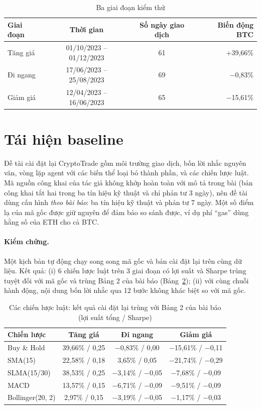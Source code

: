 \begin{table}[H]
\centering
\caption{Ba giai đoạn kiểm thử}
\label{tab:windows}
\begin{tabular}{lccr}
\toprule
Giai đoạn & Thời gian & Số ngày giao dịch & Biến động BTC \\
\midrule
Tăng giá & 01/10/2023 -- 01/12/2023 & 61 & +39,66\% \\
Đi ngang & 17/06/2023 -- 25/08/2023 & 69 & $-$0,83\% \\
Giảm giá & 12/04/2023 -- 16/06/2023 & 65 & $-$15,61\% \\
\bottomrule
\end{tabular}
\end{table}

\section{Tái hiện baseline}
\label{sec:baseline}
Đề tài cài đặt lại CryptoTrade gồm môi trường giao dịch, bốn lời nhắc nguyên văn, vòng lặp agent với các biến thể loại
bỏ thành phần, và các chiến lược luật. Mã nguồn công khai của tác giả không khớp hoàn toàn với mô tả trong bài (bản công
khai tắt hai trong ba tín hiệu kỹ thuật và chỉ phản tư 3 ngày), nên đề tài dùng cấu hình \emph{theo bài báo}: ba tín hiệu
kỹ thuật và phản tư 7 ngày. Một số điểm lạ của mã gốc được giữ nguyên để đảm bảo so sánh được, ví dụ phí ``gas'' dùng
hằng số của ETH cho cả BTC.

\paragraph{Kiểm chứng.} Một kịch bản tự động chạy song song mã gốc và bản cài đặt lại trên cùng dữ liệu. Kết quả:
(i) 6 chiến lược luật trên 3 giai đoạn có lợi suất và Sharpe trùng tuyệt đối với mã gốc và trùng Bảng 2 của bài báo
(Bảng~\ref{tab:rules}); (ii) với cùng chuỗi hành động, nội dung bốn lời nhắc qua 12 bước không khác biệt so với mã gốc.

\begin{table}[H]
\centering
\caption{Các chiến lược luật: kết quả cài đặt lại trùng với Bảng 2 của bài báo (lợi suất tổng / Sharpe)}
\label{tab:rules}
\begin{tabular}{lccc}
\toprule
Chiến lược & Tăng giá & Đi ngang & Giảm giá \\
\midrule
Buy \& Hold & 39,66\% / 0,25 & $-$0,83\% / 0,00 & $-$15,61\% / $-$0,11 \\
SMA(15) & 22,58\% / 0,18 & 3,65\% / 0,05 & $-$21,74\% / $-$0,29 \\
SLMA(15/30) & 38,53\% / 0,25 & $-$3,14\% / $-$0,05 & $-$7,68\% / $-$0,09 \\
MACD & 13,57\% / 0,15 & $-$6,71\% / $-$0,09 & $-$9,51\% / $-$0,09 \\
Bollinger(20, 2) & 2,97\% / 0,15 & $-$3,19\% / $-$0,05 & $-$1,17\% / $-$0,03 \\
\bottomrule
\end{tabular}
\end{table}

